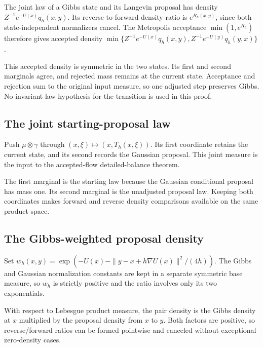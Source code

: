 \documentclass[11pt,a4paper]{article}
\begin{document}
The joint law of a Gibbs state and its Langevin proposal has density \(Z^{-1}e^{-U(x)}q_h(x,y)\). Its reverse-to-forward density ratio is \(e^{R_h(x,y)}\), since both state-independent normalizers cancel. The Metropolis acceptance \(\min(1,e^{R_h})\) therefore gives accepted density \(\min\{Z^{-1}e^{-U(x)}q_h(x,y),Z^{-1}e^{-U(y)}q_h(y,x)\}\).



This accepted density is symmetric in the two states. Its first and second marginals agree, and rejected mass remains at the current state. Acceptance and rejection sum to the original input measure, so one adjusted step preserves Gibbs. No invariant-law hypothesis for the transition is used in this proof.


\subsection{\texorpdfstring{The joint starting-proposal law}{The joint starting-proposal law}}


Push \(\mu\otimes\gamma\) through \((x,\xi)\mapsto(x,T_h(x,\xi))\). Its first coordinate retains the current state, and its second records the Gaussian proposal. This joint measure is the input to the accepted-flow detailed-balance theorem.



The first marginal is the starting law because the Gaussian conditional proposal has mass one. Its second marginal is the unadjusted proposal law. Keeping both coordinates makes forward and reverse density comparisons available on the same product space.


\subsection{\texorpdfstring{The Gibbs-weighted proposal density}{The Gibbs-weighted proposal density}}


Set \(w_h(x,y)=\exp(-U(x)-\|y-x+h\nabla U(x)\|^2/(4h))\). The Gibbs and Gaussian normalization constants are kept in a separate symmetric base measure, so \(w_h\) is strictly positive and the ratio involves only its two exponentials.



With respect to Lebesgue product measure, the pair density is the Gibbs density at \(x\) multiplied by the proposal density from \(x\) to \(y\). Both factors are positive, so reverse/\allowbreak{}forward ratios can be formed pointwise and canceled without exceptional zero-density cases.
\end{document}
